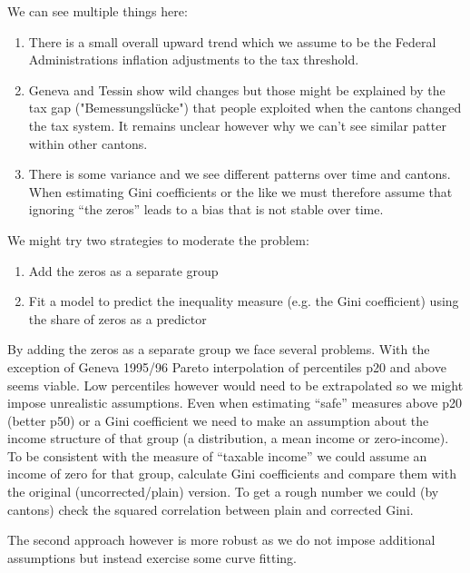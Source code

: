 \documentclass[twoside]{article}\usepackage[]{graphicx}\usepackage[]{color}
\newenvironment{knitrout}{}{} %
\begin{document}
\begin{multicols}{2}
\begin{knitrout}
\end{knitrout}


We can see multiple things here:

\begin{enumerate}
\item There is a small overall upward trend which we assume to be the Federal Administrations inflation adjustments to the tax threshold.
\item Geneva and Tessin show wild changes but those might be explained by the tax gap ("Bemessungslücke") that people exploited when the cantons changed the tax system. It remains unclear however why we can't see similar patter within other cantons.
\item There is some variance and we see different patterns over time and cantons. When estimating Gini coefficients or the like we must therefore assume that ignoring ``the zeros'' leads to a bias that is not stable over time.
\end{enumerate}

We might try two strategies to moderate the problem:

\begin{enumerate}
\item Add the zeros as a separate group
\item Fit a model to predict the inequality measure (e.g. the Gini coefficient) using the share of zeros as a predictor
\end{enumerate}

By adding the zeros as a separate group we face several problems. With the exception of Geneva 1995/96 Pareto interpolation of percentiles p20 and above seems viable. Low percentiles however would need to be extrapolated so we might impose unrealistic assumptions. Even when estimating ``safe'' measures above p20 (better p50) or a Gini coefficient we need to make an assumption about the income structure of that group (a distribution, a mean income or zero-income). To be consistent with the measure of ``taxable income'' we could assume an income of zero for that group, calculate Gini coefficients and compare them with the original (uncorrected/plain) version. To get a rough number we could (by cantons) check the squared correlation between plain and corrected Gini.

The second approach however is more robust as we do not impose additional assumptions but instead exercise some curve fitting.


\end{multicols}
\end{document}
